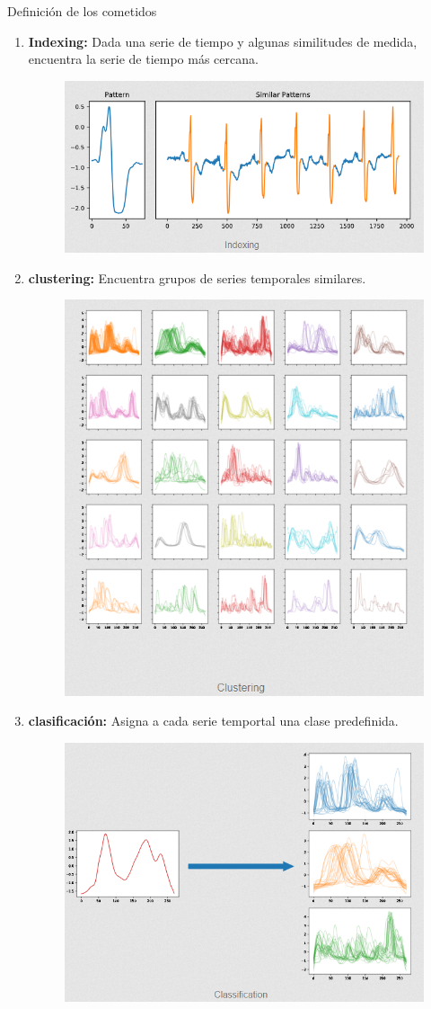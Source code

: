 \documentclass[a4paper, 11pt]{article}
\begin{document}
Definición de los cometidos
\begin{enumerate}
    \item \textbf{Indexing: } Dada una serie de tiempo y algunas similitudes de medida, encuentra la serie de tiempo más cercana.
    \begin{figure}[H] 
        \centering 
        \includegraphics[width = 10 cm]{Figures/T8.png} 
        \label{Fig. 1}
    \end{figure} 
    \item \textbf{clustering: } Encuentra grupos de series temporales similares.
    \begin{figure}[H] 
        \centering 
        \includegraphics[width = 10 cm]{Figures/T3.png} 
        \label{Fig. 2}
    \end{figure} 
    \item \textbf{clasificación: } Asigna a cada serie temportal una clase predefinida.
    \begin{figure}[H] 
        \centering 
        \includegraphics[width = 10 cm]{Figures/T2.png } 

\end{figure}
\end{enumerate}
\end{document}

